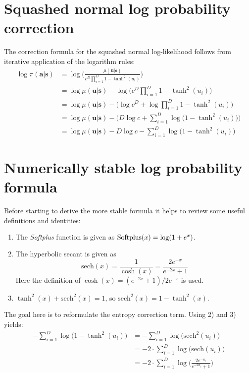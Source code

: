 \section{Squashed normal log probability correction}\label{app:log_prob_correction}
The correction formula for the squashed normal log-likelihood follows from iterative application of the logarithm rules:
\begin{align}
\log \pi (\mathbf a | \mathbf s)  & = \log \Big( \frac{\mu (\mathbf u | \mathbf s)}{ c^D \prod_{i=1}^D 1- \tanh^2 (u_i)} \Big) \nonumber \\
&  = \log \mu (\mathbf u | \mathbf s) - \log \Big( c^D \prod_{i=1}^D 1- \tanh^2 (u_i) \Big) \nonumber \\
& = \log \mu (\mathbf u | \mathbf s) - \Big( \log c^D + \log \prod_{i=1}^D 1- \tanh^2 (u_i) \Big)\nonumber \\
& = \log \mu (\mathbf u | \mathbf s) - \bigg( D \log c + \sum_{i=1}^D \log \Big( 1- \tanh^2 (u_i) \Big) \bigg) \nonumber \\
& = \log \mu (\mathbf u | \mathbf s) - D \log c - \sum_{i=1}^D \log \Big( 1- \tanh^2 (u_i) \Big)
\end{align}

\section{Numerically stable log probability formula}\label{app:log_prob_numerical stability}
Before starting to derive the more stable formula it helps to review some useful definitions and identities:
\begin{enumerate}
    \item The \emph{Softplus} function is given as $\operatorname{Softplus}(x) = \log (1 + e^x)$.  
    \item The hyperbolic secant is given as 
	$$\text{sech}(x) = \frac{1}{\cosh(x)} = \frac{2e^{-x}}{e^{-2x} + 1}$$
	Here the definition of $\cosh(x) =  (e^{-2x} + 1)/ 2e^{-x}$ is used.  
	\item $\tanh^2(x) + \text{sech}^2(x) = 1$, so $\text{sech}^2(x) = 1 - \tanh^2(x)$.   
\end{enumerate}
The goal here is to reformulate the entropy correction term. Using 2) and 3) yields:
\begin{align}
- \sum_{i=1}^D \log \Big( 1- \tanh^2 (u_i) \Big) & = - \sum_{i=1}^D \log \Big( \text{sech}^2 (u_i) \Big) \nonumber \\
& = - 2 \cdot \sum_{i=1}^D \log \Big( \text{sech} (u_i) \Big) \nonumber \\
& = - 2 \cdot \sum_{i=1}^D \log \Big( \frac{2e^{-u_i}}{e^{-2u_i} + 1} \Big) \label{eq:app_stable_correction_sech}
\end{align}


